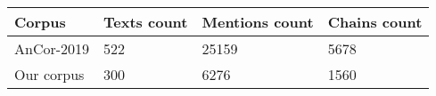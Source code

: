 \begin{tabular}{|p{}| p{}|p{}|p{}|}
\hline
Corpus &  Texts count &  Mentions count &  Chains count 
\\ \hline
AnCor-2019 & 522 & 25159 &5678 \\ \hline
Our corpus & 300 & 6276 & 1560 \\ \hline
\end{tabular}